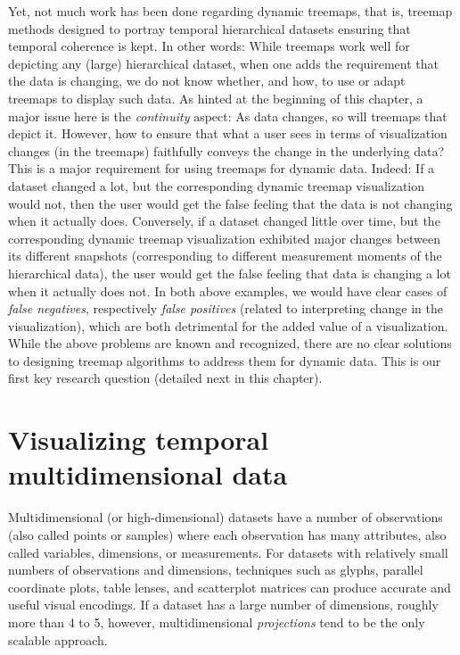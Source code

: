 Yet, not much work has been done regarding dynamic treemaps, that is, treemap methods designed to portray temporal hierarchical datasets ensuring that temporal coherence is kept. In other words: While treemaps work well for depicting any (large) hierarchical dataset, when one adds the requirement that the data is changing, we do not know whether, and how, to use or adapt treemaps to display such data. As hinted at the beginning of this chapter, a major issue here is the \emph{continuity} aspect: As data changes, so will treemaps that depict it. However, how to ensure that what a user sees in terms of visualization changes (in the treemaps) faithfully conveys the change in the underlying data? This is a major requirement for using treemaps for dynamic data. Indeed: If a dataset changed a lot, but the corresponding dynamic treemap visualization would not, then the user would get the false feeling that the data is not changing when it actually does. Conversely, if a dataset changed little over time, but the corresponding dynamic treemap visualization exhibited major changes between its different snapshots (corresponding to different measurement moments of the hierarchical data), the user would get the false feeling that data is changing a lot when it actually does not. In both above examples, we would have clear cases of \emph{false negatives}, respectively \emph{false positives} (related to interpreting change in the visualization), which are both detrimental for the added value of a visualization. While the above problems are known and recognized, there are no clear solutions to designing treemap algorithms to address them for dynamic data. This is our first key research question (detailed next in this chapter).


\section{Visualizing temporal multidimensional data}
\label{sec:ch1_highdim}
%
Multidimensional (or high-dimensional) datasets have a number of observations (also called points or samples) where each observation has many attributes, also called variables, dimensions, or measurements. 
For datasets with relatively small numbers of observations and dimensions, techniques such as glyphs, parallel coordinate plots, table lenses, and scatterplot matrices can produce accurate and useful visual encodings.  
If a dataset has a large number of dimensions, roughly more than 4 to 5, however, multidimensional \emph{projections} tend to be the only scalable approach.  

